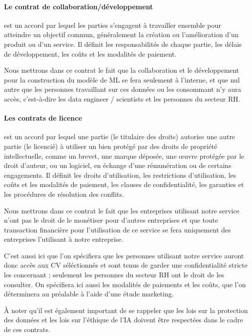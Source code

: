\paragraph{Le contrat de collaboration/développement} est un accord par lequel les parties s'engagent à travailler ensemble pour atteindre un objectif commun, généralement la création ou l'amélioration d'un produit ou d'un service. Il définit les responsabilités de chaque partie, les délais de développement, les coûts et les modalités de paiement.

Nous mettrons dans ce contrat le fait que la collaboration et le développement pour la construction du modèle de ML se fera seulement à l'interne, et que nul autre que les personnes travaillant sur ces données ou les consommant n'y aura accès, c'est-à-dire les data engineer / scientists et les personnes du secteur RH.\newline

\paragraph{Les contrats de licence} est un accord par lequel une partie (le titulaire des droits) autorise une autre partie (le licencié) à utiliser un bien protégé par des droits de propriété intellectuelle, comme un brevet, une marque déposée, une œuvre protégée par le droit d'auteur, ou un logiciel, en échange d'une rémunération ou de certains engagements. Il définit les droits d'utilisation, les restrictions d'utilisation, les coûts et les modalités de paiement, les clauses de confidentialité, les garanties et les procédures de résolution des conflits.

Nous mettrons dans ce contrat le fait que les entreprises utilisant notre service n'ont pas le droit de le monétiser pour d'autres entreprises et que toute transaction financière pour l'utilisation de ce service se fera uniquement des entreprises l'utilisant à notre entreprise. \newline

C'est aussi ici que l'on spécifiera que les personnes utilisant notre service auront donc accès aux CV séléctionnés et sont tenus de garder une confidentialité stricte les concernant ; seulement les personnes du secteur RH ont le droit de les consulter. On spécifiera ici aussi les modalités de paiements et les coûts, que l'on déterminera au préalable à l'aide d'une étude marketing.

À noter qu'il est également important de se rappeler que les lois sur la protection des données et les lois sur l'éthique de l'IA doivent être respectées dans le cadre de ces contrats.


